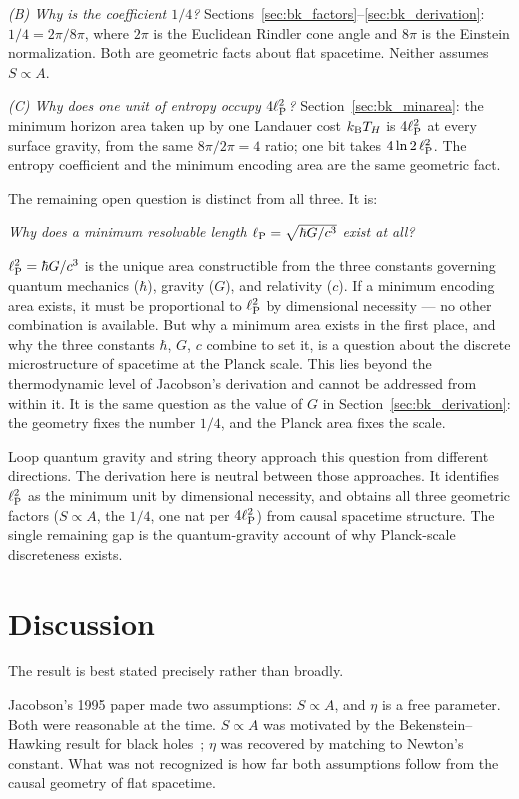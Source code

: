 \emph{(B) Why is the coefficient $1/4$?} Sections~\ref{sec:bk_factors}--\ref{sec:bk_derivation}: $1/4=2\pi/8\pi$, where $2\pi$ is the Euclidean Rindler cone angle and $8\pi$
is the Einstein normalization. Both are geometric facts about flat spacetime. Neither assumes $S\propto A$. \derived

\emph{(C) Why does one unit of entropy occupy $4\ell_{\mathrm P}^2$?} Section~\ref{sec:bk_minarea}: the minimum horizon area taken up by one Landauer cost $k_{\mathrm B} T_H$ is $4\ell_{\mathrm P}^2$ at every
surface gravity, from the same $8\pi/2\pi=4$ ratio; one bit takes $4\ln2\,\ell_{\mathrm P}^2$. The entropy coefficient and the minimum encoding area are the same
geometric fact. \derived

The remaining open question is distinct from all three. It is:
\begin{center}\emph{Why does a minimum resolvable length $\ell_{\mathrm P}=\sqrt{\hbar G/c^3}$ exist at all?}\end{center}
$\ell_{\mathrm P}^2=\hbar G/c^3$ is the unique area constructible from the three constants governing quantum mechanics ($\hbar$), gravity ($G$), and relativity ($c$). If a
minimum encoding area exists, it must be proportional to $\ell_{\mathrm P}^2$ by dimensional necessity --- no other combination is available. But why a minimum area exists
in the first place, and why the three constants $\hbar$, $G$, $c$ combine to set it, is a question about the discrete microstructure of spacetime at the
Planck scale. This lies beyond the thermodynamic level of Jacobson's derivation and cannot be addressed from within it. It is the same question as the
value of $G$ in Section~\ref{sec:bk_derivation}: the geometry fixes the number $1/4$, and the Planck area fixes the scale. \openprob

Loop quantum gravity and string theory approach this question from different directions. The derivation here is neutral between those approaches. It
identifies $\ell_{\mathrm P}^2$ as the minimum unit by dimensional necessity, and obtains all three geometric factors ($S\propto A$, the $1/4$, one nat per $4\ell_{\mathrm P}^2$) from
causal spacetime structure. The single remaining gap is the quantum-gravity account of why Planck-scale discreteness exists.

\section{Discussion}\label{sec:bk_discussion}
The result is best stated precisely rather than broadly.

Jacobson's 1995 paper made two assumptions: $S\propto A$, and $\eta$ is a free parameter. Both were reasonable at the time. $S\propto A$ was motivated by the
Bekenstein--Hawking result for black holes~\cite{Bekenstein1973,Hawking1975}; $\eta$ was recovered by matching to Newton's constant. What was not recognized is how far both
assumptions follow from the causal geometry of flat spacetime.

